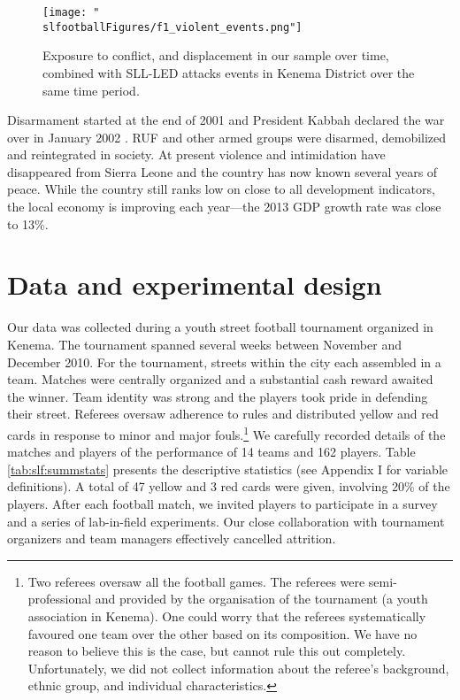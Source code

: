 \begin{figure}[htb]
  \texttt{[image: "\\slfootballFigures/f1\_violent\_events.png"]}
  \caption{Exposure to conflict, and displacement in our sample over time, combined with SLL-LED attacks events in Kenema District over the same time period.}
  \label{fig:slf:conflictexposure}
\end{figure}

Disarmament started at the end of 2001 and President Kabbah declared the war over in January 2002 \cite{Peters2011}. RUF and other armed groups were disarmed, demobilized and reintegrated in society. At present violence and intimidation have disappeared from Sierra Leone and the country has now known several years of peace. While the country still ranks low on close to all development indicators, the local economy is improving each year––the 2013 GDP growth rate was close to 13\%.

\section{Data and experimental design}
\label{sec:slf:data}
Our data was collected during a youth street football tournament organized in Kenema. The tournament spanned several weeks between November and December 2010. For the tournament, streets within the city each assembled in a team. Matches were centrally organized and a substantial cash reward awaited the winner. Team identity was strong and the players took pride in defending their street. Referees oversaw adherence to rules and distributed yellow and red cards in response to minor and major fouls.\footnote{Two referees oversaw all the football games. The referees were semi-professional and provided by the organisation of the tournament (a youth association in Kenema). One could worry that the referees systematically favoured one team over the other based on its composition. We have no reason to believe this is the case, but cannot rule this out completely. Unfortunately, we did not collect information about the referee’s background, ethnic group, and individual characteristics.}  We carefully recorded details of the matches and players of the performance of 14 teams and 162 players.  Table \ref{tab:slf:summstats} presents the descriptive statistics (see Appendix I for variable definitions). A total of 47 yellow and 3 red cards were given, involving 20\% of the players. After each football match, we invited players to participate in a survey and a series of lab-in-field experiments. Our close collaboration with tournament organizers and team managers effectively cancelled attrition. 


